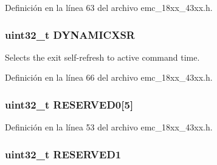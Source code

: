 Definición en la línea 63 del archivo emc\+\_\+18xx\+\_\+43xx.\+h.

\subsubsection[{\texorpdfstring{D\+Y\+N\+A\+M\+I\+C\+X\+SR}{DYNAMICXSR}}]{ uint32\+\_\+t D\+Y\+N\+A\+M\+I\+C\+X\+SR}\hypertarget{struct_l_p_c___e_m_c___t_ae2f30e1f6a168caf81c913fd0a9cf3a8}{}\label{struct_l_p_c___e_m_c___t_ae2f30e1f6a168caf81c913fd0a9cf3a8}
Selects the exit self-\/refresh to active command time. 

Definición en la línea 66 del archivo emc\+\_\+18xx\+\_\+43xx.\+h.

\subsubsection[{\texorpdfstring{R\+E\+S\+E\+R\+V\+E\+D0}{RESERVED0}}]{ uint32\+\_\+t R\+E\+S\+E\+R\+V\+E\+D0\mbox{[}5\mbox{]}}\hypertarget{struct_l_p_c___e_m_c___t_abcea022b884a52d0aa9657e2cdd15ce1}{}\label{struct_l_p_c___e_m_c___t_abcea022b884a52d0aa9657e2cdd15ce1}


Definición en la línea 53 del archivo emc\+\_\+18xx\+\_\+43xx.\+h.

\subsubsection[{\texorpdfstring{R\+E\+S\+E\+R\+V\+E\+D1}{RESERVED1}}]{ uint32\+\_\+t R\+E\+S\+E\+R\+V\+E\+D1}\hypertarget{struct_l_p_c___e_m_c___t_a39fbdbb7ad559315fa9c23de59936655}{}\label{struct_l_p_c___e_m_c___t_a39fbdbb7ad559315fa9c23de59936655}


